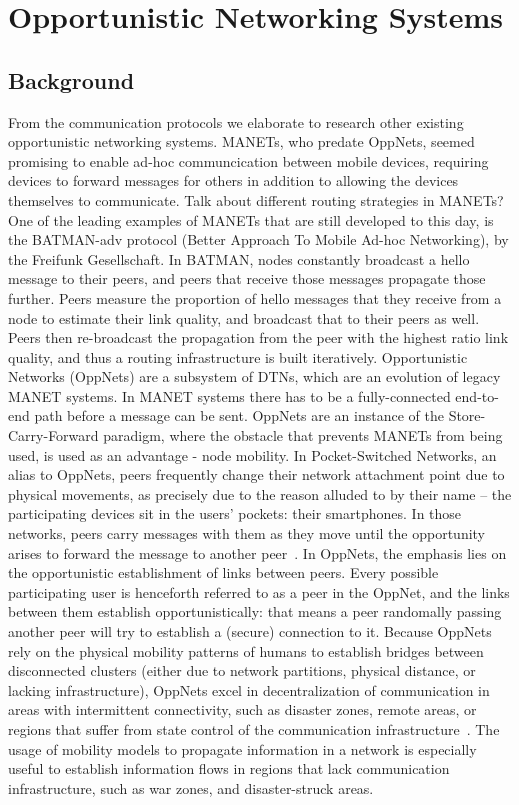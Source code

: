 \section{Opportunistic Networking Systems}
\label{sec:oppnet}
\subsection{Background}
From the communication protocols we elaborate to research other existing opportunistic networking systems.
MANETs, who predate OppNets, seemed promising to enable ad-hoc communcication between mobile devices, requiring devices to forward messages for others in addition to allowing the devices themselves to communicate.
Talk about different routing strategies in MANETs?
One of the leading examples of MANETs that are still developed to this day, is the BATMAN-adv protocol (Better Approach To Mobile Ad-hoc Networking), by the Freifunk Gesellschaft.
In BATMAN, nodes constantly broadcast a hello message to their peers, and peers that receive those messages propagate those further. Peers measure the proportion of hello messages that they receive from a node to estimate their link quality, and broadcast that to their peers as well. Peers then re-broadcast the propagation from the peer with the highest ratio link quality, and thus a routing infrastructure is built iteratively.
Opportunistic Networks (OppNets) are a subsystem of DTNs, which are an evolution of legacy MANET systems.
In MANET systems there has to be a fully-connected end-to-end path before a message can be sent.
OppNets are an instance of the Store-Carry-Forward paradigm, where the obstacle that prevents MANETs from being used, is used as an advantage - node mobility. In Pocket-Switched Networks, an alias to OppNets, peers frequently change their network attachment point due to physical movements, as precisely due to the reason alluded to by their name -- the participating devices sit in the users' pockets: their smartphones. In those networks, peers carry messages with them as they move until the opportunity arises to forward the message to another peer~\cite{Boldrini2014}.
In OppNets, the emphasis lies on the opportunistic establishment of links between peers. Every possible participating user is henceforth referred to as a peer in the OppNet, and the links between them establish opportunistically: that means a peer randomally passing another peer will try to establish a (secure) connection to it.
Because OppNets rely on the physical mobility patterns of humans to establish bridges between disconnected clusters (either due to network partitions, physical distance, or lacking infrastructure), OppNets excel in decentralization of communication in areas with intermittent connectivity, such as disaster zones, remote areas, or regions that suffer from state control of the communication infrastructure~\cite{Strobel2024,Alsulami2022,Pozza2015}. The usage of mobility models to propagate information in a network is especially useful to establish information flows in regions that lack communication infrastructure, such as war zones, and disaster-struck areas.

